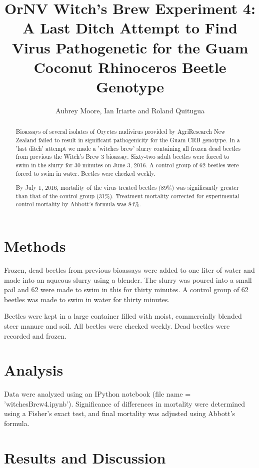 \documentclass[letterpaper,11pt]{scrartcl}
\title{OrNV Witch's Brew Experiment 4: A Last Ditch Attempt to Find Virus Pathogenetic for the Guam Coconut
Rhinoceros Beetle Genotype}
\author{Aubrey Moore, Ian Iriarte and Roland Quitugua}
\begin{document}
\maketitle

\begin{abstract}
Bioassays of several isolates of Oryctes nudivirus provided by AgriResearch New Zealand failed to result in 
significant pathogenicity for the Guam CRB genotype. In a 'last ditch' attempt we made a 'witches brew' slurry 
containing all frozen dead beetles from previous the Witch's Brew 3 bioassay. Sixty-two 
adult beetles were forced to swim in the slurry for 30 minutes on June 3, 2016. A control group of
62 beetles were forced to swim in water. Beetles were checked weekly.

By July 1, 2016, mortality of the virus treated beetles (89\%) was significantly greater than that of the
control group (31\%). Treatment mortality corrected for experimental control mortality by Abbott's 
formula was 84\%.
\end{abstract}

\section*{Methods}

Frozen, dead beetles from previous bioassays were added to one liter of water and made into an aqueous slurry
using a blender.  The slurry was poured into a small pail and
62 were made to swim in this for thirty minutes. A control group of 62 beetles was made to swim in water for 
thirty minutes.

Beetles were kept in a large container filled with moist, commercially blended steer manure and soil. 
All beetles were checked weekly. Dead beetles were recorded and frozen.

\section*{Analysis}

Data were analyzed using an IPython notebook (file name = 'witchesBrew4.ipynb'). Significance of differences in mortality
were determined using a Fisher's exact test, and final mortality was adjusted using Abbott's formula.

\section*{Results and Discussion}
\end{document}
